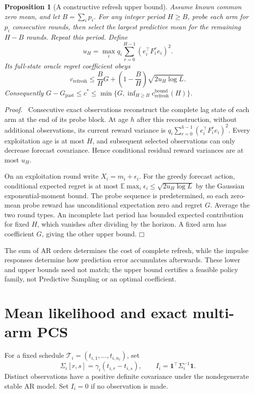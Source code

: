 \documentclass[11pt]{article}
\newtheorem{proposition}[theorem]{Proposition}
\newenvironment{proof}{\par\noindent\textit{Proof.}\ }{\hfill$\mdlgwhtsquare$\par\medskip}
\newcommand{\E}{\mathbb E}
\begin{document}
\begin{proposition}[A constructive refresh upper bound]
Assume known common zero mean, and let $B=\sum_i p_i$. For any integer period $H\geq B$, probe each arm for $p_i$ consecutive rounds, then select the largest predictive mean for the remaining $H-B$ rounds. Repeat this period. Define
\begin{equation}
u_H=\max_i q_i\sum_{r=0}^{H-1}(e_i^\top F_i^re_i)^2.
\end{equation}
Its full-state oracle regret coefficient obeys
\begin{equation}
\boxed{c_{\mathrm{refresh}}\leq
\frac BH G+\left(1-\frac BH\right)\sqrt{2u_H\log L}.}
\label{eq:refresh}
\end{equation}
Consequently $G-G_{\mathrm{past}}\leq c^*\leq\min\{G,\inf_{H\geq B}c_{\mathrm{refresh}}^{\mathrm{bound}}(H)\}$.
\end{proposition}
\begin{proof}
Consecutive exact observations reconstruct the complete lag state of each arm at the end of its probe block. At age $h$ after this reconstruction, without additional observations, its current reward variance is
$q_i\sum_{r=0}^{h-1}(e_i^\top F_i^re_i)^2$. Every exploitation age is at most $H$, and subsequent selected observations can only decrease forecast covariance. Hence conditional residual reward variances are at most $u_H$.

On an exploitation round write $X_i=m_i+\epsilon_i$. For the greedy forecast action, conditional expected regret is at most $\E\max_i\epsilon_i\leq\sqrt{2u_H\log L}$ by the Gaussian exponential-moment bound. The probe sequence is predetermined, so each zero-mean probe reward has unconditional expectation zero and regret $G$. Average the two round types. An incomplete last period has bounded expected contribution for fixed $H$, which vanishes after dividing by the horizon. A fixed arm has coefficient $G$, giving the other upper bound.
\end{proof}
The sum of AR orders determines the cost of complete refresh, while the impulse responses determine how prediction error accumulates afterwards. These lower and upper bounds need not match; the upper bound certifies a feasible policy family, not Predictive Sampling or an optimal coefficient.

\section{Mean likelihood and exact multi-arm PCS}
For a fixed schedule $\mathcal T_i=(t_{i,1},\ldots,t_{i,n_i})$, set
\begin{equation}
\Sigma_i[r,s]=\gamma_i(t_{i,r}-t_{i,s}),\qquad
I_i=\mathbf1^\top\Sigma_i^{-1}\mathbf1.
\label{eq:info}
\end{equation}
Distinct observations have a positive definite covariance under the nondegenerate stable AR model. Set $I_i=0$ if no observation is made.
\end{document}
